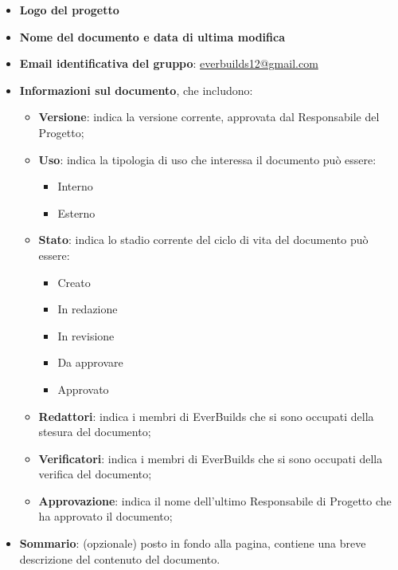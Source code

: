                     \begin{itemize}
                        \item\textbf{Logo del progetto}
                        \item\textbf{Nome del documento e data di ultima modifica}
                        \item\textbf{Email identificativa del gruppo}: \href{mailto:everbuilds12@gmail.com}{everbuilds12@gmail.com}
                        \item\textbf{Informazioni sul documento}, che includono: \\
                            \begin{itemize}
                                \item\textbf{Versione}: indica la versione corrente, approvata dal Responsabile del Progetto;
                                \item\textbf{Uso}: indica la tipologia di uso che interessa il documento può essere:
                                    \begin{itemize}
                                        \item Interno
                                        \item Esterno
                                    \end{itemize}
                                \item\textbf{Stato}: indica lo stadio corrente del ciclo di vita del documento può essere: 
                                    \begin{itemize}
                                        \item Creato
                                        \item In redazione
                                        \item In revisione
                                        \item Da approvare
                                        \item Approvato
                                    \end{itemize}
                                \item\textbf{Redattori}: indica i membri di EverBuilds che si sono occupati della stesura del documento;
                                \item\textbf{Verificatori}: indica i membri di EverBuilds che si sono occupati della verifica del documento;
                                \item\textbf{Approvazione}: indica il nome dell’ultimo Responsabile di Progetto che ha approvato il documento;
                            \end{itemize}
                        \item\textbf{Sommario}: (opzionale) posto in fondo alla pagina, contiene una breve descrizione del contenuto del documento.
                    \end{itemize}
